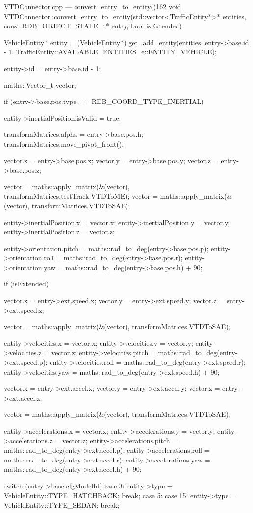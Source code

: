 \begin{codelist}{VTDConnector.cpp --- convert\_entry\_to\_entity()}{162}
void VTDConnector::convert_entry_to_entity(std::vector<TrafficEntity*>* entities, const RDB_OBJECT_STATE_t* entry, bool isExtended) {
	VehicleEntity* entity = (VehicleEntity*) get_add_entity(entities, entry->base.id - 1, TrafficEntity::AVAILABLE_ENTITIES_e::ENTITY_VEHICLE);

	entity->id = entry->base.id - 1;

	maths::Vector_t vector;

	if (entry->base.pos.type == RDB_COORD_TYPE_INERTIAL) {
		entity->inertialPosition.isValid = true;

		transformMatrices.alpha = entry->base.pos.h;
		transformMatrices.move_pivot_front();

		vector.x = entry->base.pos.x;
		vector.y = entry->base.pos.y;
		vector.z = entry->base.pos.z;

		vector = maths::apply_matrix(&(vector), transformMatrices.testTrack.VTDToME);
		vector = maths::apply_matrix(&(vector), transformMatrices.VTDToSAE);

		entity->inertialPosition.x = vector.x;
		entity->inertialPosition.y = vector.y;
		entity->inertialPosition.z = vector.z;
	}

	entity->orientation.pitch = maths::rad_to_deg(entry->base.pos.p);
	entity->orientation.roll  = maths::rad_to_deg(entry->base.pos.r);
	entity->orientation.yaw   = maths::rad_to_deg(entry->base.pos.h) + 90;

	if (isExtended) {
		vector.x = entry->ext.speed.x;
		vector.y = entry->ext.speed.y;
		vector.z = entry->ext.speed.z;

		vector = maths::apply_matrix(&(vector), transformMatrices.VTDToSAE);

		entity->velocities.x     = vector.x;
		entity->velocities.y     = vector.y;
		entity->velocities.z     = vector.z;
		entity->velocities.pitch = maths::rad_to_deg(entry->ext.speed.p);
		entity->velocities.roll  = maths::rad_to_deg(entry->ext.speed.r);
		entity->velocities.yaw   = maths::rad_to_deg(entry->ext.speed.h) + 90;

		vector.x = entry->ext.accel.x;
		vector.y = entry->ext.accel.y;
		vector.z = entry->ext.accel.z;

		vector = maths::apply_matrix(&(vector), transformMatrices.VTDToSAE);

		entity->accelerations.x     = vector.x;
		entity->accelerations.y     = vector.y;
		entity->accelerations.z     = vector.z;
		entity->accelerations.pitch = maths::rad_to_deg(entry->ext.accel.p);
		entity->accelerations.roll  = maths::rad_to_deg(entry->ext.accel.r);
		entity->accelerations.yaw   = maths::rad_to_deg(entry->ext.accel.h) + 90;
	}

	switch (entry->base.cfgModelId) {
		case 3:
			entity->type = VehicleEntity::TYPE_HATCHBACK;
			break;
		case 5:
		case 15:
			entity->type = VehicleEntity::TYPE_SEDAN;
			break;
	}
}
\end{codelist}

